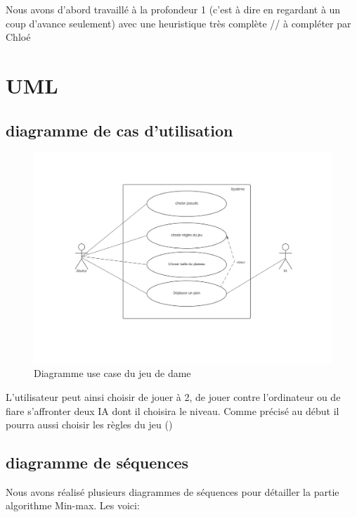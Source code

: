 \documentclass[12,french]{report}
\begin{document}
Nous avons d'abord travaillé à la profondeur 1 (c'est à dire en regardant à un coup d'avance seulement) avec une heuristique très complète
// à compléter par Chloé


\chapter{UML}

\section{diagramme de cas d'utilisation}

\begin{figure}[H]
	\center
	\includegraphics[width=1\textwidth]{./Images/Diagramme_use_case}
	\caption{Diagramme use case du jeu de dame}
\end{figure}\vspace{0.2cm}
L'utilisateur peut ainsi choisir de jouer à 2, de jouer contre l'ordinateur
ou de fiare s'affronter deux IA dont il choisira le niveau. Comme précisé au début il pourra aussi choisir les règles du jeu ()
\section{diagramme de séquences}

Nous avons réalisé plusieurs diagrammes de séquences pour détailler
la partie algorithme Min-max. Les voici:
\end{document}
